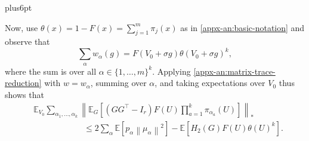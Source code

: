 \documentclass[11pt,letterpaper,twoside,leqno]{article}
\makeatletter
\theoremstyle{bookplain}
\theoremstyle{bookremark}
\renewenvironment{proof}[1][\proofname]{\par
  \pushQED{\qed}\normalfont\topsep6pt plus6pt\relax
  \trivlist\item[\hskip\labelsep\bfseries #1\@addpunct{.}]\ignorespaces
}{\popQED\endtrivlist\@endpefalse}
\newcommand{\E}{\mathbb E}
\newcommand{\norm}[1]{\left\lVert#1\right\rVert}
\makeatother
\begin{document}
\begin{proof}
Now, use $\theta(x) = 1 - F(x) = \sum_{j=1}^m \pi_j(x)$ as in \eqref{appx-an:basic-notation} and observe that
\begin{equation}\label{appx-an:total-product-weight}
 \sum_\alpha w_\alpha(g)=F(V_0+\sigma g)\theta(V_0+\sigma g)^k,
\end{equation}
where the sum is over all $\alpha\in\{1,\dots,m\}^k$. Applying \eqref{appx-an:matrix-trace-reduction} with $w = w_{\alpha}$, summing over $\alpha$, and taking expectations over $V_0$ thus shows that
\begin{align}
& \E_{V_0}\sum_{\alpha_1,\ldots,\alpha_k}
 \left\|\E_G\left[(GG^\top-I_r)F(U)
              \prod_{a=1}^k\pi_{\alpha_a}(U)\right]\right\|_* \nonumber\\
& \qquad\qquad\qquad \le  2\sum_\alpha \E[p_\alpha\norm{\mu_\alpha}^2]
- \E[H_2(G)F(U)\theta(U)^k]. \label{appx-an:matrix-main-split}
\end{align}


\end{proof}
\end{document}

